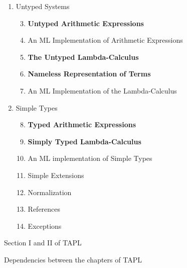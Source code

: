 \documentclass[a4paper, oneside, 12pt, titlepage]{article}
\begin{document}
\begin{figure}[h]
  \footnotesize
  \centering
  \begin{varwidth}{\textwidth}
    \begin{enumerate}[label=\Roman*]
      \itemsep 1pt
      \item Untyped Systems \hfill
        \begin{enumerate}[label=§ \arabic*]
          \setcounter{enumii}{2}
          \item \textbf{Untyped Arithmetic Expressions}
          \item An ML Implementation of Arithmetic Expressions
          \item \textbf{The Untyped Lambda-Calculus}
          \item \textbf{Nameless Representation of Terms}
          \item An ML Implementation of the Lambda-Calculus
        \end{enumerate}
      \item Simple Types \hfill
        \begin{enumerate}[label=§ \arabic*]
          \setcounter{enumii}{7}
          \item \textbf{Typed Arithmetic Expressions}
          \item \textbf{Simply Typed Lambda-Calculus}
          \item An ML implementation of Simple Types
          \item Simple Extensions
          \item Normalization
          \item References
          \item Exceptions
        \end{enumerate}
    \end{enumerate}
  \end{varwidth}
  \caption{Section I and II of TAPL}
  \label{fig:TAPL-toc}
\end{figure}

\begin{figure}[h]
  \begin{center}
  \end{center}
  \caption{Dependencies between the chapters of TAPL}
  \label{fig:TAPL-dependencies}
\end{figure}
\end{document}
